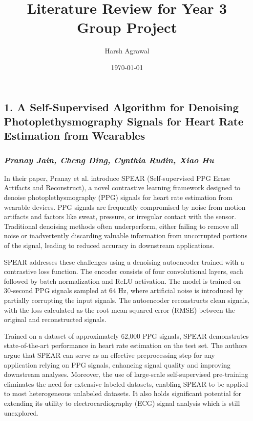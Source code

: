 \documentclass[letterpaper,12pt]{article}
\begin{document}
\title{Literature Review for Year 3 Group Project}
\author[1]{Harsh Agrawal}


\date{\today}
\maketitle

\subsection*{1. A Self-Supervised Algorithm for Denoising Photoplethysmography Signals for Heart Rate Estimation from Wearables}
\subsubsection*{\textbf{\textit{Pranay Jain, Cheng Ding, Cynthia Rudin, Xiao Hu}}}
\sloppy
In their paper, Pranay et al. introduce SPEAR (Self-supervised PPG Erase Artifacts and Reconstruct), a novel contrastive learning framework designed to denoise photoplethysmography (PPG) signals for heart rate estimation from wearable devices. PPG signals are frequently compromised by noise from motion artifacts and factors like sweat, pressure, or irregular contact with the sensor. Traditional denoising methods often underperform, either failing to remove all noise or inadvertently discarding valuable information from uncorrupted portions of the signal, leading to reduced accuracy in downstream applications.

SPEAR addresses these challenges using a denoising autoencoder trained with a
contrastive loss function. The encoder consists of four convolutional layers,
each followed by batch normalization and ReLU activation. The model is trained
on 30-second PPG signals sampled at 64 Hz, where artificial noise is introduced
by partially corrupting the input signals. The autoencoder reconstructs clean
signals, with the loss calculated as the root mean squared error (RMSE) between
the original and reconstructed signals.

Trained on a dataset of approximately 62,000 PPG signals, SPEAR demonstrates
state-of-the-art performance in heart rate estimation on the test set. The
authors argue that SPEAR can serve as an effective preprocessing step for any
application relying on PPG signals, enhancing signal quality and improving
downstream analyses. Moreover, the use of large-scale self-supervised
pre-training eliminates the need for extensive labeled datasets, enabling SPEAR
to be applied to most heterogeneous unlabeled datasets. It also holds
significant potential for extending its utility to electrocardiography (ECG)
signal analysis which is still unexplored.
\end{document}
